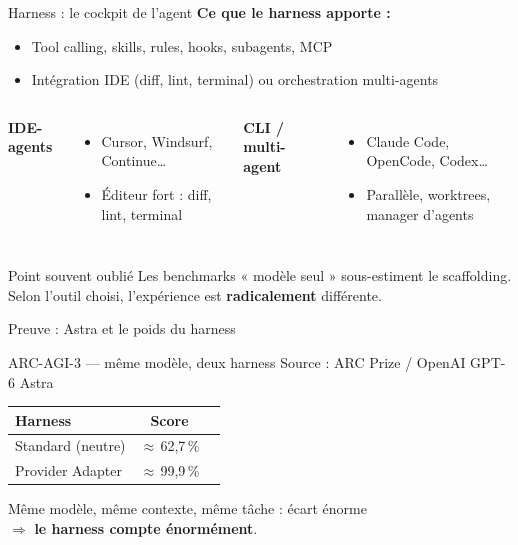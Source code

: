 \documentclass[aspectratio=169]{beamer}
\begin{document}
\begin{frame}{Harness : le cockpit de l'agent}
    \textbf{Ce que le harness apporte :}
    \begin{itemize}
        \item Tool calling, skills, rules, hooks, subagents, MCP
        \item Intégration IDE (diff, lint, terminal) ou orchestration multi-agents
    \end{itemize}
    \vspace{0.3cm}
    \begin{columns}[T]
        \textbf{IDE-agents}
        \begin{itemize}
            \item Cursor, Windsurf, Continue\dots
            \item Éditeur fort : diff, lint, terminal
        \end{itemize}
        \textbf{CLI / multi-agent}
        \begin{itemize}
            \item Claude Code, OpenCode, Codex\dots
            \item Parallèle, worktrees, manager d'agents
        \end{itemize}
    \end{columns}
    \vspace{0.4cm}
    \begin{alertblock}{Point souvent oublié}
        Les benchmarks « modèle seul » sous-estiment le scaffolding.\\
        Selon l'outil choisi, l'expérience est \textbf{radicalement} différente.
    \end{alertblock}
\end{frame}

\begin{frame}{Preuve : Astra et le poids du harness}
    \begin{block}{ARC-AGI-3 --- même modèle, deux harness}
        Source : ARC Prize / OpenAI GPT-6 Astra
    \end{block}
    \vspace{0.3cm}
    \begin{table}
        \centering
        \begin{tabular}{lcc}
            \toprule
            \textbf{Harness} & \textbf{Score} \\
            \midrule
            Standard (neutre) & $\approx$\,62,7\,\%  \\
            Provider Adapter & $\approx$\,99,9\,\%  \\
            \bottomrule
        \end{tabular}
    \end{table}
    \vspace{0.4cm}
    \centering
    \Large
    Même modèle, même contexte, même tâche : écart énorme \\ 
    $\Rightarrow$ \textbf{le harness compte énormément}.
\end{frame}
\end{document}
